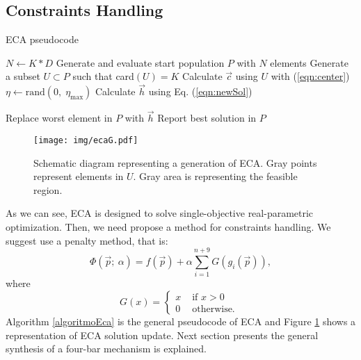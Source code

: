 \documentclass[12pt,letterpape]{article}
\begin{document}

\subsection{Constraints Handling} %
\label{sub:constraints_handling}

\begin{algorithm}[!ht]
	\caption{ECA pseudocode}
	\label{algoritmoEca}
	\begin{algorithmic}[1]
		\State $N \gets K * D$
		\State Generate and evaluate start population $P$ with $N$ elements
				\State Generate a subset $U \subset P$ such that  card$(U) = K$
				\State Calculate $\vec{c}$ using $U$ with (\ref{eqn:center})
				\State $\eta \gets \text{rand}(0,\; \eta_{\max}) $ 
				\State Calculate $\vec{h}$ using Eq. (\ref{eqn:newSol})
				
					\State Replace worst element in $P$ with $\vec{h}$
				\EndIf
			\EndFor
		\EndWhile
		\State Report best solution in $P$
		\EndProcedure
	\end{algorithmic}
\end{algorithm}


\begin{figure}[!ht]
	\centering
	\texttt{[image: img/ecaG.pdf]}
	\caption{Schematic diagram representing a generation of ECA. Gray points %
	represent elements in $U$. Gray area is representing the feasible region.}
	\label{fig:ecag}       %
\end{figure}

As we can see, ECA is designed to solve single-objective real-parametric optimization.
Then, we need propose a method for constraints handling. We suggest use a penalty
method, that is:
% 
\begin{equation}
	\Phi( \vec{p} ;\ \alpha ) = f( \vec{p} ) + \alpha \sum_{i=1}^{n+9} G(g_i( \vec{p} ) ),
% 
	\label{eqn:phiObj}
% 
\end{equation}
where 
$$
G(x) = 
\begin{cases}
	\displaystyle
	x & \text{ if } x > 0 \\
	0 & \text{ otherwise. }
\end{cases}
$$
% 
% 
% 
Algorithm \ref{algoritmoEca} is the general pseudocode of ECA and Figure \ref{fig:ecag}
shows a representation of ECA solution update. 
% 
Next section presents the general
synthesis of a four-bar mechanism is explained.
% 
% 
\end{document}
